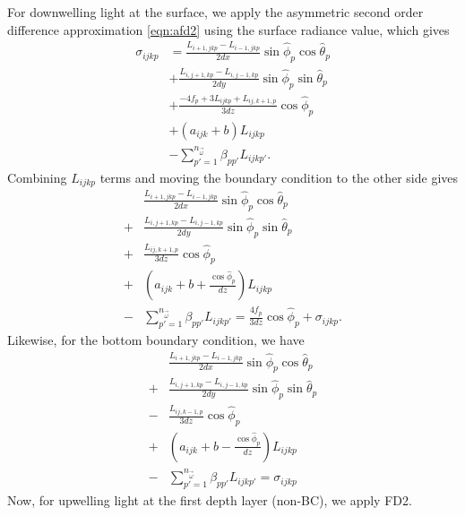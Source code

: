 For downwelling light at the surface, we apply the asymmetric second order difference approximation \eqref{eqn:afd2}
using the surface radiance value, which gives
\begin{equation*}
  \begin{aligned}
    \sigma_{ijkp} &= \frac{L_{i+1,jkp}-L_{i-1,jkp}}{2dx}\sin\hat{\phi}_p\cos\hat{\theta}_p \\
    &+ \frac{L_{i,j+1,kp}-L_{i,j-1,kp}}{2dy}\sin\hat{\phi}_p\sin\hat{\theta}_p \\
    &+ \frac{-4f_p + 3L_{ijkp} + L_{ij,k+1,p}}{3dz}\cos\hat{\phi}_p \\
    &+ (a_{ijk}+b)L_{ijkp} \\
    &- \sum_{p'=1}^{n_{\vec{\omega}}} \beta_{pp'} L_{ijkp'}.
  \end{aligned}
\end{equation*}
Combining $L_{ijkp}$ terms and moving the boundary condition to the other side gives
\begin{equation*}
  \begin{aligned}
    &\frac{L_{i+1,jkp}-L_{i-1,jkp}}{2dx}\sin\hat{\phi}_p\cos\hat{\theta}_p \\
    + &\frac{L_{i,j+1,kp}-L_{i,j-1,kp}}{2dy}\sin\hat{\phi}_p\sin\hat{\theta}_p \\
    + &\frac{L_{ij,k+1,p}}{3dz}\cos\hat{\phi}_p \\
    + &\left(a_{ijk}+b + \frac{\cos\hat{\phi}_p}{dz} \right) L_{ijkp} \\
    - &\sum_{p'=1}^{n_{\vec{\omega}}} \beta_{pp'} L_{ijkp'} = \frac{4f_p}{3dz} \cos\hat{\phi}_p + \sigma_{ijkp}.
  \end{aligned}
\end{equation*}
Likewise, for the bottom boundary condition, we have
\begin{equation*}
  \begin{aligned}
    &\frac{L_{i+1,jkp}-L_{i-1,jkp}}{2dx}\sin\hat{\phi}_p\cos\hat{\theta}_p \\
    + &\frac{L_{i,j+1,kp}-L_{i,j-1,kp}}{2dy}\sin\hat{\phi}_p\sin\hat{\theta}_p \\
    - &\frac{L_{ij,k-1,p}}{3dz}\cos\hat{\phi}_p \\
    + &\left(a_{ijk}+b - \frac{\cos\hat{\phi}_p}{dz} \right) L_{ijkp} \\
    - &\sum_{p'=1}^{n_{\vec{\omega}}} \beta_{pp'} L_{ijkp'} = \sigma_{ijkp}
  \end{aligned}
\end{equation*}
Now, for upwelling light at the first depth layer (non-BC), we apply FD2.
